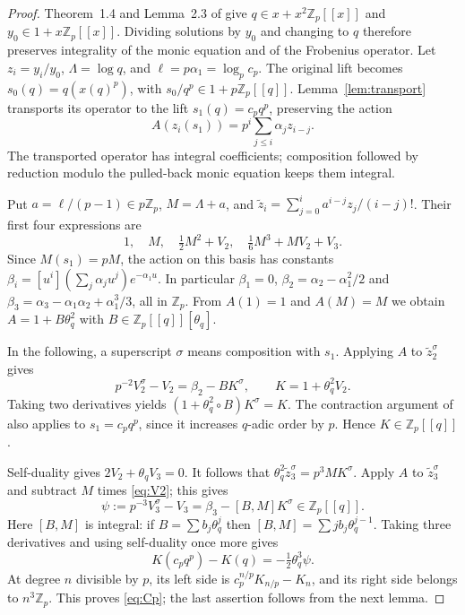 \documentclass[11pt]{amsart}
\theoremstyle{definition}
\theoremstyle{remark}
\newcommand{\Z}{\mathbb{Z}}
\begin{document}
\begin{proof}
Theorem~1.4 and Lemma~2.3 of \cite{BV} give $q\in x+x^2\Z_p[[x]]$ and
$y_0\in1+x\Z_p[[x]]$. Dividing solutions by $y_0$ and changing to $q$ therefore
preserves integrality of the monic equation and of the Frobenius operator.
Let $z_i=y_i/y_0$, $\Lambda=\log q$, and $\ell=p\alpha_1=\log_p c_p$.
The original lift becomes $s_0(q)=q(x(q)^p)$, with $s_0/q^p\in1+p\Z_p[[q]]$.
Lemma~\ref{lem:transport} transports its operator to the lift
$s_1(q)=c_pq^p$, preserving the action
\[
A(z_i(s_1))=p^i\sum_{j\le i}\alpha_jz_{i-j}.
\]
The transported operator has integral coefficients; composition followed by
reduction modulo the pulled-back monic equation keeps them integral.

Put $a=\ell/(p-1)\in p\Z_p$, $M=\Lambda+a$, and
$\widetilde z_i=\sum_{j=0}^i a^{i-j}z_j/(i-j)!$.
Their first four expressions are
\[
1,\quad M,\quad \tfrac12M^2+V_2,\quad
\tfrac16M^3+M V_2+V_3.
\]
Since $M(s_1)=pM$, the action on this basis has constants
$\beta_i=[u^i](\sum_j\alpha_j u^j)e^{-\alpha_1u}$.
In particular $\beta_1=0$,
$\beta_2=\alpha_2-\alpha_1^2/2$ and
$\beta_3=\alpha_3-\alpha_1\alpha_2+\alpha_1^3/3$, all in $\Z_p$.
From $A(1)=1$ and $A(M)=M$ we obtain $A=1+B\theta_q^2$ with
$B\in\Z_p[[q]][\theta_q]$.

In the following, a superscript $\sigma$ means composition with $s_1$.
Applying $A$ to $\widetilde z_2^\sigma$ gives
\begin{equation}\label{eq:V2}
p^{-2}V_2^\sigma-V_2=\beta_2-BK^\sigma,\qquad K=1+\theta_q^2V_2.
\end{equation}
Taking two derivatives yields $(1+\theta_q^2\circ B)K^\sigma=K$.
The contraction argument of \cite[Lemma~2.3]{BV} also applies to $s_1=c_pq^p$,
since it increases $q$-adic order by $p$. Hence $K\in\Z_p[[q]]$.

Self-duality gives $2V_2+\theta_qV_3=0$. It follows that
$\theta_q^2\widetilde z_3^\sigma=p^3 M K^\sigma$.
Apply $A$ to $\widetilde z_3^\sigma$ and subtract $M$ times \eqref{eq:V2}; this gives
\[
\psi:=p^{-3}V_3^\sigma-V_3
=\beta_3-[B,M]K^\sigma\in\Z_p[[q]].
\]
Here $[B,M]$ is integral: if $B=\sum b_j\theta_q^j$ then
$[B,M]=\sum j b_j\theta_q^{j-1}$.
Taking three derivatives and using self-duality once more gives
\[
K(c_pq^p)-K(q)=-\tfrac12\theta_q^3\psi.
\]
At degree $n$ divisible by $p$, its left side is
$c_p^{n/p}K_{n/p}-K_n$, and its right side belongs to $n^3\Z_p$.
This proves \eqref{eq:Cp}; the last assertion follows from the next lemma.
\end{proof}
\end{document}

